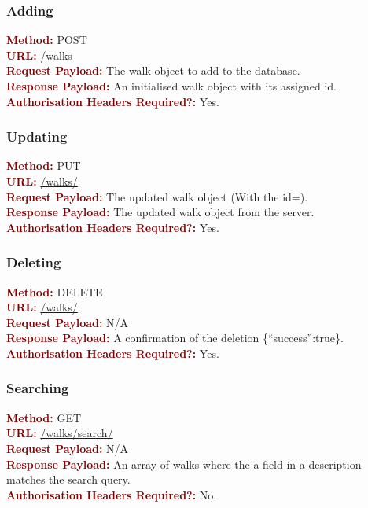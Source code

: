 \documentclass[11pt,a4paper]{report}
\begin{document}
\subsubsection{Adding}
\textbf{\textcolor{Maroon}{Method:}} POST\\
\textbf{\textcolor{Maroon}{URL:}} \url{/walks}\\
\textbf{\textcolor{Maroon}{Request Payload:}} The walk object to add to the database.\\
\textbf{\textcolor{Maroon}{Response Payload:}} An initialised walk object with its assigned id.\\
\textbf{\textcolor{Maroon}{Authorisation Headers Required?:}} Yes.

\subsubsection{Updating}
\textbf{\textcolor{Maroon}{Method:}} PUT\\
\textbf{\textcolor{Maroon}{URL:}} \url{/walks/}\\
\textbf{\textcolor{Maroon}{Request Payload:}} The updated walk object (With the id=).\\
\textbf{\textcolor{Maroon}{Response Payload:}} The updated walk object from the server.\\
\textbf{\textcolor{Maroon}{Authorisation Headers Required?:}} Yes.

\subsubsection{Deleting}
\textbf{\textcolor{Maroon}{Method:}} DELETE\\
\textbf{\textcolor{Maroon}{URL:}} \url{/walks/}\\
\textbf{\textcolor{Maroon}{Request Payload:}} N/A\\
\textbf{\textcolor{Maroon}{Response Payload:}} A confirmation of the deletion \{``success'':true\}.\\
\textbf{\textcolor{Maroon}{Authorisation Headers Required?:}} Yes.

\subsubsection{Searching}
\textbf{\textcolor{Maroon}{Method:}} GET\\
\textbf{\textcolor{Maroon}{URL:}} \url{/walks/search/}\\
\textbf{\textcolor{Maroon}{Request Payload:}} N/A\\
\textbf{\textcolor{Maroon}{Response Payload:}} An array of walks where the a field in a description matches the search query.\\
\textbf{\textcolor{Maroon}{Authorisation Headers Required?:}} No.
\end{document}
